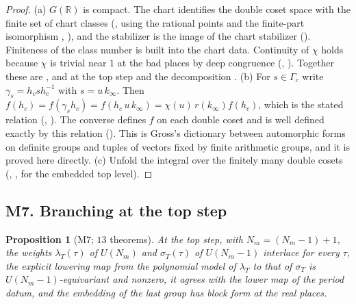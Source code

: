 \documentclass[11pt]{article}
\newtheorem{proposition}[theorem]{Proposition}
\theoremstyle{remark}
\begin{document}
\begin{proof}
(a) $G(\mathbb R)$ is compact. The chart identifies the double coset space with the finite set of chart classes (, using the rational points and the finite-part isomorphism , ), and the stabilizer is the image of the chart stabilizer (). Finiteness of the class number is built into the chart data. Continuity of $\chi$ holds because $\chi$ is trivial near $1$ at the bad places by deep congruence (, ). Together these are , and at the top step  and the decomposition . (b) For $s\in\Gamma_c$ write $\gamma_s=h_csh_c^{-1}$ with $s=u\,k_\infty$. Then $f(h_c)=f(\gamma_sh_c)=f(h_c\,u\,k_\infty)=\chi(u)\,r(k_\infty)f(h_c)$, which is the stated relation (, ). The converse defines $f$ on each double coset and is well defined exactly by this relation (). This is Gross's dictionary between automorphic forms on definite groups and tuples of vectors fixed by finite arithmetic groups, and it is proved here directly. (c) Unfold the integral over the finitely many double cosets (, ,  for the embedded top level).
\end{proof}

\subsection{M7. Branching at the top step}

\begin{proposition}[M7; $13$ theorems]\label{prop:M7}
At the top step, with $N_m=(N_m-1)+1$, the weights $\lambda_T(\tau)$ of $U(N_m)$ and $\sigma_T(\tau)$ of $U(N_m-1)$ interlace for every $\tau$, the explicit lowering map from the polynomial model of $\lambda_T$ to that of $\sigma_T$ is $U(N_m-1)$-equivariant and nonzero, it agrees with the lower map of the period datum, and the embedding of the last group has block form at the real places.
\end{proposition}
\end{document}
